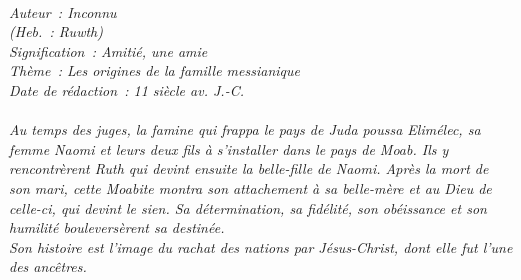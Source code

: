 \BFont
\noindent\hrulefill
{\footnotesize
\textit{
\bigskip
{\centering{}
\\Auteur~: Inconnu
\\(Heb.~: Ruwth)
\\Signification~: Amitié, une amie
\\Thème~: Les origines de la famille messianique
\\Date de rédaction~: 11 siècle av. J.-C.\\}
}
\textit{
\\Au temps des juges, la famine qui frappa le pays de Juda poussa Elimélec, sa femme Naomi et leurs deux fils à s'installer dans le pays de Moab. Ils y rencontrèrent Ruth qui devint ensuite la belle-fille de Naomi. Après la mort de son mari, cette Moabite montra son attachement à sa belle-mère et au Dieu de celle-ci, qui devint le sien. Sa détermination, sa fidélité, son obéissance et son humilité bouleversèrent sa destinée.
\\Son histoire est l'image du rachat des nations par Jésus-Christ, dont elle fut l'une des ancêtres.\bigskip
}
}
\par\nobreak\noindent\hrulefill
